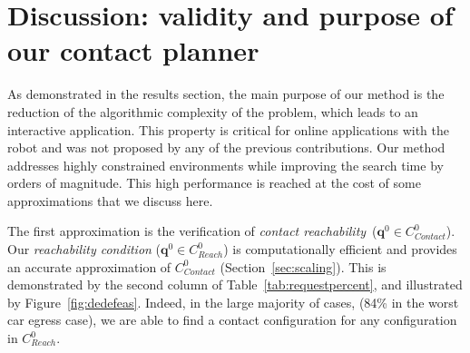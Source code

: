 \documentclass[journal]{IEEEtran}
\newcommand{\contactreachability}{\textit{contact reachability}}	%
\newcommand{\gls}[1]{\textit{#1}}
\begin{document}



 \section{Discussion: validity and purpose of our contact planner} 
\label{sec:discussion}


As demonstrated in the results section, the main purpose of our method is the reduction of the algorithmic complexity of the problem, which leads to an interactive 
application. This property is critical for 
online applications with the robot and was not proposed by any of the previous contributions. Our method addresses highly constrained environments while improving the search time by orders of magnitude. This high performance is reached at the cost of some approximations that we discuss here. 

The first approximation is the verification of \contactreachability\ ($\mathbf{q}^0 \in C_{Contact}^0$).  Our \textit{reachability condition} ($\mathbf{q}^0 \in C_{Reach}^0$) is computationally efficient and provides an accurate approximation of $C_{Contact}^0$ (Section~\ref{sec:scaling}). This is demonstrated by the second column of Table~\ref{tab:requestpercent}, and illustrated by Figure~\ref{fig:dedefeas}. Indeed, in the large majority of cases, (84\% in the worst car egress case), we are able to find a contact configuration for any configuration in $C_{Reach}^0$.

\end{document}
